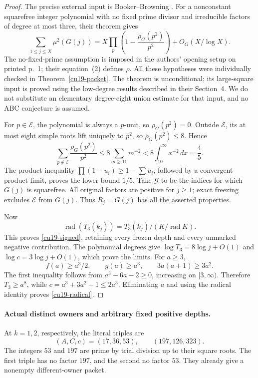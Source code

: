 \begin{proof}
The precise external input is Booker--Browning
\cite[Theorem~1.2, printed p.~4]{BookerBrowning2016Squarefree}.
For a nonconstant squarefree integer polynomial with no fixed
prime divisor and irreducible factors of degree at most three,
their theorem gives
\begin{equation}
 \sum_{1\le j\le X}\mu^2(G(j))
 =X\prod_p\left(1-\frac{\rho_G(p^2)}{p^2}\right)
   +O_G(X/\log X).
 \label{cu19-bb}
\end{equation}
The no-fixed-prime assumption is imposed in the authors' opening
setup on printed p.~1; their equation~(2) defines \(\rho\).
All these hypotheses were individually checked in
Theorem~\ref{cu19-packet}. The theorem is unconditional; its
large-square input is proved using the low-degree results described
in their Section~4. We do not substitute an elementary degree-eight
union estimate for that input, and no ABC conjecture is assumed.

For \(p\in\mathcal E\), the polynomial is always a \(p\)-unit, so
\(\rho_G(p^2)=0\). Outside \(\mathcal E\), its at most eight simple
roots lift uniquely to \(p^2\), so \(\rho_G(p^2)\le8\). Hence
\[
 \sum_{p\notin\mathcal E}\frac{\rho_G(p^2)}{p^2}
 \le8\sum_{m\ge11}m^{-2}
 <8\int_{10}^{\infty}x^{-2}\,dx=\frac45.
\]
The product inequality \(\prod(1-u_i)\ge1-\sum u_i\), followed
by a convergent product limit, proves the lower bound \(1/5\).
Take \(\mathcal G\) to be the indices for which \(G(j)\) is squarefree.
All original factors are positive for \(j\ge1\); exact freezing
excludes \(\mathcal E\) from \(G(j)\). Thus \(R_j=G(j)\) has all
the asserted properties.

Now
\[
 \operatorname{rad}(T_3(k_j))
 =T_3(k_j)/(K/\operatorname{rad}K).
\]
This proves \eqref{cu19-signed}, retaining every frozen depth and
every unmarked negative contribution. The polynomial degrees give
\(\log T_3=8\log j+O(1)\) and \(\log c=3\log j+O(1)\), which prove
the limits. For \(a\ge3\),
\[
 f(a)\ge a^3/2,\qquad g(a)\ge a^3,\qquad 3a(a+1)\ge3a^2.
\]
The first inequality follows from \(a^3-6a-2\ge0\), increasing on
\([3,\infty)\). Therefore \(T_3\ge a^8\), while
\(c=a^3+3a^2-1\le2a^3\). Eliminating \(a\) and using the radical
identity proves \eqref{cu19-radical}.
\end{proof}

\paragraph{Actual distinct owners and arbitrary fixed positive depths.}
At \(k=1,2\), respectively, the literal triples are
\[
 (A,C,c)=(17,36,53),\qquad (197,126,323).
\]
The integers \(53\) and \(197\) are prime by trial division up to
their square roots. The first triple has no factor \(197\), and
the second no factor \(53\). They already give a nonempty
different-owner packet.


